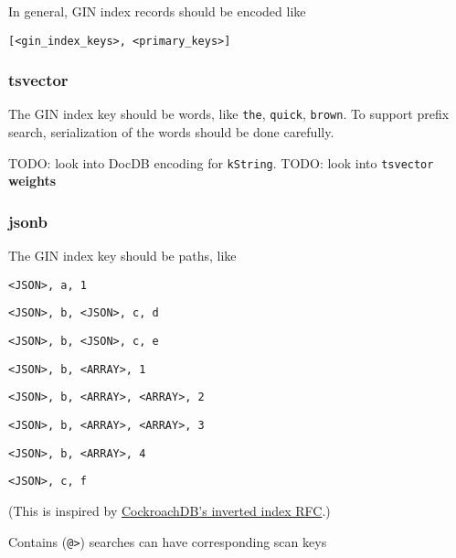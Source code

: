 \documentclass[11pt]{article}
\begin{document}
In general, GIN index records should be encoded like

\texttt{{[}\textless{}gin\_index\_keys\textgreater{},\ \textless{}primary\_keys\textgreater{}{]}}

\hypertarget{tsvector}{%
\subsubsection{tsvector}\label{tsvector}}

The GIN index key should be words, like \texttt{the}, \texttt{quick},
\texttt{brown}. To support prefix search, serialization of the words
should be done carefully.

TODO: look into DocDB encoding for \texttt{kString}. TODO: look into
\texttt{tsvector} \textbf{weights}

\hypertarget{jsonb}{%
\subsubsection{jsonb}\label{jsonb}}

The GIN index key should be paths, like

\begin{nparts}
\item
  \texttt{\textless{}JSON\textgreater{},\ a,\ 1}
\item
  \texttt{\textless{}JSON\textgreater{},\ b,\ \textless{}JSON\textgreater{},\ c,\ d}
\item
  \texttt{\textless{}JSON\textgreater{},\ b,\ \textless{}JSON\textgreater{},\ c,\ e}
\item
  \texttt{\textless{}JSON\textgreater{},\ b,\ \textless{}ARRAY\textgreater{},\ 1}
\item
  \texttt{\textless{}JSON\textgreater{},\ b,\ \textless{}ARRAY\textgreater{},\ \textless{}ARRAY\textgreater{},\ 2}
\item
  \texttt{\textless{}JSON\textgreater{},\ b,\ \textless{}ARRAY\textgreater{},\ \textless{}ARRAY\textgreater{},\ 3}
\item
  \texttt{\textless{}JSON\textgreater{},\ b,\ \textless{}ARRAY\textgreater{},\ 4}
\item
  \texttt{\textless{}JSON\textgreater{},\ c,\ f}
\end{nparts}

(This is inspired by
\href{https://github.com/cockroachdb/cockroach/blob/master/docs/RFCS/20171020_inverted_indexes.md}{CockroachDB's
inverted index RFC}.)

Contains (\texttt{@\textgreater{}}) searches can have corresponding scan
keys
\end{document}
